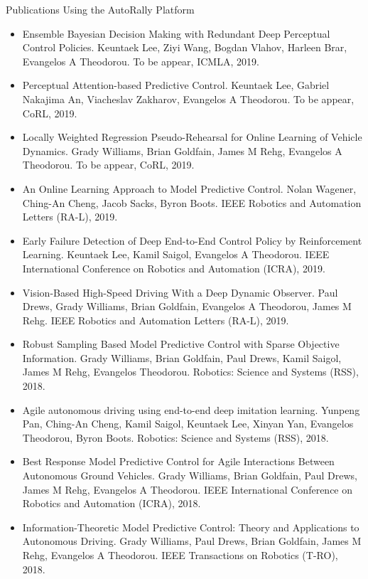 \documentclass[aspectratio=169]{beamer}
\begin{document}
\begin{frame}{Publications Using the AutoRally Platform}
\begin{multicols}{2}
	\fontsize{5pt}{0}\selectfont
	\begin{itemize}
		\item Ensemble Bayesian Decision Making with Redundant Deep Perceptual Control Policies. Keuntaek Lee, Ziyi Wang, Bogdan Vlahov, Harleen Brar, Evangelos A Theodorou. To be appear, ICMLA, 2019.
		\item Perceptual Attention-based Predictive Control. Keuntaek Lee, Gabriel Nakajima An, Viacheslav Zakharov, Evangelos A Theodorou. To be appear, CoRL, 2019.
		\item Locally Weighted Regression Pseudo-Rehearsal for Online Learning of Vehicle Dynamics. Grady Williams, Brian Goldfain, James M Rehg, Evangelos A Theodorou. To be appear, CoRL, 2019.
		\item An Online Learning Approach to Model Predictive Control. Nolan Wagener, Ching-An Cheng, Jacob Sacks, Byron Boots. IEEE Robotics and Automation Letters (RA-L), 2019.
		\item Early Failure Detection of Deep End-to-End Control Policy by Reinforcement Learning. Keuntaek Lee, Kamil Saigol, Evangelos A Theodorou. IEEE International Conference on Robotics and Automation (ICRA), 2019.
		\item \alert{Vision-Based High-Speed Driving With a Deep Dynamic Observer. Paul Drews, Grady Williams, Brian Goldfain, Evangelos A Theodorou, James M Rehg. IEEE Robotics and Automation Letters (RA-L), 2019.}
		\item Robust Sampling Based Model Predictive Control with Sparse Objective Information. Grady Williams, Brian Goldfain, Paul Drews, Kamil Saigol, James M Rehg, Evangelos Theodorou. Robotics: Science and Systems (RSS), 2018.
		\item Agile autonomous driving using end-to-end deep imitation learning. Yunpeng Pan, Ching-An Cheng, Kamil Saigol, Keuntaek Lee, Xinyan Yan, Evangelos Theodorou, Byron Boots. Robotics: Science and Systems (RSS), 2018.
		\item Best Response Model Predictive Control for Agile Interactions Between Autonomous Ground Vehicles. Grady Williams, Brian Goldfain, Paul Drews, James M Rehg, Evangelos A Theodorou. IEEE International Conference on Robotics and Automation (ICRA), 2018.
		\item Information-Theoretic Model Predictive Control: Theory and Applications to Autonomous Driving. Grady Williams, Paul Drews, Brian Goldfain, James M Rehg, Evangelos A Theodorou. IEEE Transactions on Robotics (T-RO), 2018.

\end{itemize}
\end{multicols}
\end{frame}
\end{document}
